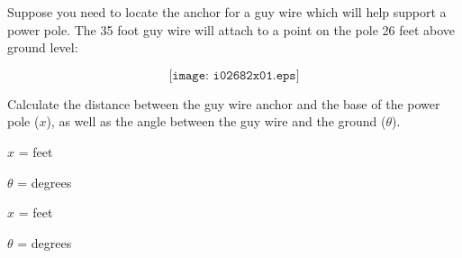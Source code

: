 

Suppose you need to locate the anchor for a guy wire which will help support a power pole.  The 35 foot guy wire will attach to a point on the pole 26 feet above ground level:

$$\texttt{[image: i02682x01.eps]}$$

Calculate the distance between the guy wire anchor and the base of the power pole ($x$), as well as the angle between the guy wire and the ground ($\theta$).

\vskip 10pt

$x$ = \underbar{\hskip 50pt} feet

\vskip 30pt

$\theta$ = \underbar{\hskip 50pt} degrees

\vskip 10pt








$x$ =  feet

\vskip 30pt

$\theta$ =  degrees












